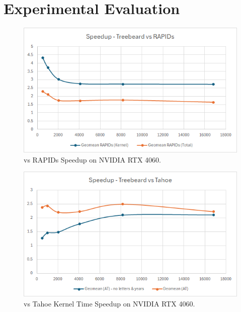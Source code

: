 \section{Experimental Evaluation}
\label{sec:results}


\begin{figure}[htb]
  \centering
  \includegraphics[width=\linewidth]{figures/TBvsRAPIDs_4060_Speedup.png}
  \caption{\Treebeard{} vs RAPIDs Speedup on NVIDIA RTX 4060.}
  \label{Fig:TBvsRAPIDs_4060_Speedup}
\end{figure}

\begin{figure}[htb]
  \centering
  \includegraphics[width=\linewidth]{figures/TBvsTahoe_4060_KernelTimeSpeedup.png}
  \caption{\Treebeard{} vs Tahoe Kernel Time Speedup on NVIDIA RTX 4060.}
  \label{Fig:TBvsTahoe_4060_KernelTimeSpeedup}
\end{figure}

